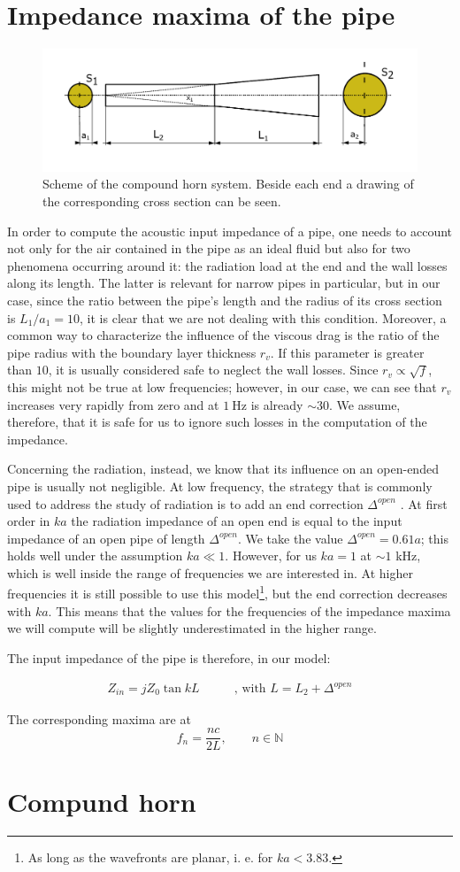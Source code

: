 \documentclass[a4paper]{article}
\begin{document}
\section{Impedance maxima of the pipe}

\begin{figure}[h!]
	\centering
	\includegraphics[width=0.8\linewidth]{diagramma.pdf}
	\caption{Scheme of the compound horn system. Beside each end a drawing of the corresponding cross section can be seen.}
	\label{fig:diag}
\end{figure}

In order to compute the acoustic input impedance of a pipe, one needs to account not only for the air contained in the pipe as an ideal fluid but also for two phenomena occurring around it: the radiation load at the end and the wall losses along its length. The latter is relevant for narrow pipes in particular, but in our case, since the ratio between the pipe's length and the radius of its cross section is $L_1/a_1 = 10$, it is clear that we are not dealing with this condition. Moreover, a common way to characterize the influence of the viscous drag is the ratio of the pipe radius with the boundary layer thickness $r_v$. If this parameter is greater than $10$, it is usually considered safe to neglect the wall losses. Since $r_v \propto \sqrt{f} $, this might not be true at low frequencies; however, in our case, we can see that $r_v$ increases very rapidly from zero and at $\SI{1}{\hertz}$ is already $ \sim 30 $. We assume, therefore, that it is safe for us to ignore such losses in the computation of the impedance. 

Concerning the radiation, instead, we know that its influence on an open-ended pipe is usually not negligible. At low frequency, the strategy that is commonly used to address the study of radiation is to add an end correction $\Delta^{open}$ . At first order in $ka$ the radiation impedance of an open end is equal to the input impedance of an open pipe of length $\Delta^{open}$. We take the value $\Delta^{open} = 0.61 a$; this holds well under the assumption $ka \ll 1 $. However, for us $ka = 1$ at $\sim 1$ kHz, which is well inside the range of frequencies we are interested in. At higher frequencies it is still possible to use this model\footnote{As long as the wavefronts are planar, i. e. for $ka<3.83$.}, but the end correction decreases with $ka$. This means that the values for the frequencies of the impedance maxima we will compute will be slightly underestimated in the higher range.

The input impedance of the pipe is therefore, in our model:

\begin{align*}
	Z_{in} = jZ_0 \tan{kL} \qquad & \text{, with } L = L_2 + \Delta^{open}
\end{align*}

The corresponding maxima are at
$$ f_n = \frac{nc}{2L}, \qquad n \in \mathbb{N} $$

\section{Compund horn}
\end{document}
